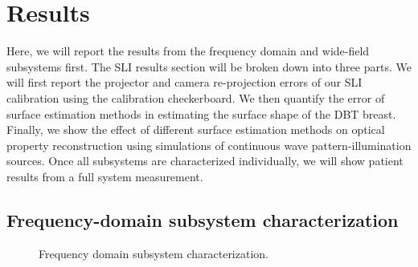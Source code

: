 \section{Results}
\label{chap:omci:results}
Here, we will report the results from the frequency domain and wide-field subsystems first. The \ac{SLI} results section will be broken down into three parts. We will first report the projector and camera re-projection errors of our \ac{SLI} calibration using the calibration checkerboard. We then quantify the error of surface estimation methods in estimating the surface shape of the \ac{DBT} breast. Finally, we show the effect of different surface estimation methods on optical property reconstruction using simulations of continuous wave pattern-illumination sources. Once all subsystems are characterized individually, we will show patient results from a full system measurement.


\subsection{Frequency-domain subsystem characterization}
\begin{figure}[]
    \begin{center}
    \end{center}
    \caption{Frequency domain subsystem characterization.} 
    \label{fig:RFSystem}
\end{figure} 

